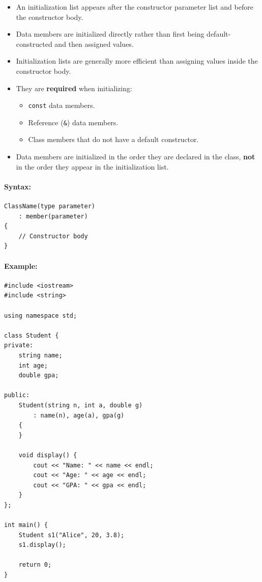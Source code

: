\documentclass[10pt]{article}
\begin{document}
\begin{itemize}
    \item An initialization list appears after the constructor parameter list and before the constructor body.
    \item Data members are initialized directly rather than first being default-constructed and then assigned values.
    \item Initialization lists are generally more efficient than assigning values inside the constructor body.
    \item They are \textbf{required} when initializing:
    \begin{itemize}
        \item \verb|const| data members.
        \item Reference (\verb|&|) data members.
        \item Class members that do not have a default constructor.
    \end{itemize}
    \item Data members are initialized in the order they are declared in the class, \textbf{not} in the order they appear in the initialization list.
\end{itemize}

\paragraph{Syntax:}

\begin{verbatim}
ClassName(type parameter)
    : member(parameter)
{
    // Constructor body
}
\end{verbatim}

\paragraph{Example:}

\begin{verbatim}
#include <iostream>
#include <string>

using namespace std;

class Student {
private:
    string name;
    int age;
    double gpa;

public:
    Student(string n, int a, double g)
        : name(n), age(a), gpa(g)
    {
    }

    void display() {
        cout << "Name: " << name << endl;
        cout << "Age: " << age << endl;
        cout << "GPA: " << gpa << endl;
    }
};

int main() {
    Student s1("Alice", 20, 3.8);
    s1.display();

    return 0;
}
\end{verbatim}
\end{document}
